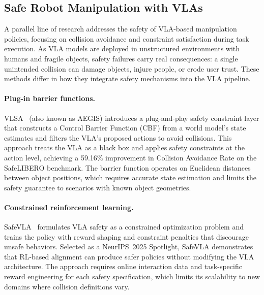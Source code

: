 \subsection{Safe Robot Manipulation with VLAs}
\label{sec:rw_safe}

A parallel line of research addresses the safety of VLA-based manipulation policies, focusing on collision avoidance and constraint satisfaction during task execution. As VLA models are deployed in unstructured environments with humans and fragile objects, safety failures carry real consequences: a single unintended collision can damage objects, injure people, or erode user trust. These methods differ in how they integrate safety mechanisms into the VLA pipeline.

\paragraph{Plug-in barrier functions.}
VLSA~\cite{hu2025aegis} (also known as AEGIS) introduces a plug-and-play safety constraint layer that constructs a Control Barrier Function (CBF) from a world model's state estimates and filters the VLA's proposed actions to avoid collisions. This approach treats the VLA as a black box and applies safety constraints at the action level, achieving a 59.16\% improvement in Collision Avoidance Rate on the SafeLIBERO benchmark. The barrier function operates on Euclidean distances between object positions, which requires accurate state estimation and limits the safety guarantee to scenarios with known object geometries.

\paragraph{Constrained reinforcement learning.}
SafeVLA~\cite{zhan2025safevla} formulates VLA safety as a constrained optimization problem and trains the policy with reward shaping and constraint penalties that discourage unsafe behaviors. Selected as a NeurIPS~2025 Spotlight, SafeVLA demonstrates that RL-based alignment can produce safer policies without modifying the VLA architecture. The approach requires online interaction data and task-specific reward engineering for each safety specification, which limits its scalability to new domains where collision definitions vary.

